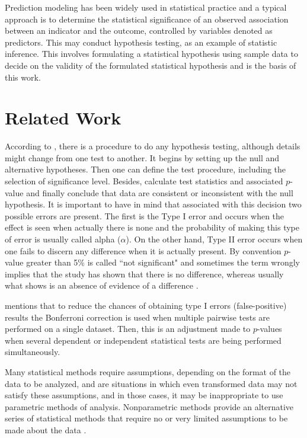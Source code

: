 \documentclass[5p,times]{elsarticle}
\begin{document}
	 Prediction modeling has been widely used in statistical practice and a typical approach is to determine the statistical significance of an observed association between an indicator and the outcome, controlled by variables denoted as predictors. This may conduct hypothesis testing, as an example of statistic inference. This involves formulating a statistical hypothesis using sample data to decide on the validity of the formulated statistical hypothesis and is the basis of this work.
	 

\section{Related Work}\label{Section3}
	
	According to \citet{ilakovac2009statistical}, there is a procedure to do any hypothesis testing, although details might change from one test to another. It begins by setting up the null and alternative hypotheses. Then one can define the test procedure, including the selection of significance level. Besides, calculate test statistics and associated $p$-value and finally conclude that data are consistent or inconsistent with the null hypothesis. It is important to have in mind that associated with this decision two possible errors are present. The first is the Type I error and occurs when the effect is seen when actually there is none and the probability of making this type of error is usually called alpha ($\alpha$). On the other hand, Type II error occurs when one fails to discern any difference when it is actually present. By convention $p$-value greater than 5\% is called ``not significant" and sometimes the term wrongly implies that the study has shown that there is no difference, whereas usually what shows is an absence of evidence of a difference \cite{altman1995statistics}. 
	
	\citet{napierala2012bonferroni} mentions that to reduce the chances of obtaining type I errors (false-positive) results the Bonferroni correction is used when multiple pairwise tests are performed on a single dataset. Then, this is an adjustment made to $p$-values when several dependent or independent statistical tests are being performed simultaneously.
	
	Many statistical methods require assumptions, depending on the format of the data to be analyzed, and are situations in which even transformed data may not satisfy these assumptions, and in those cases, it may be inappropriate to use parametric methods of analysis. Nonparametric methods provide an alternative series of statistical methods that require no or very limited assumptions to be made about the data \cite{whitley2002statistics}.
	 
\end{document}
